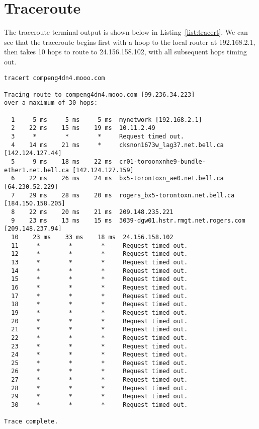 \section*{Traceroute}
The traceroute terminal output is shown below in Listing~\ref{list:tracert}. We can see that the traceroute begins first with a hoop to the local router at 192.168.2.1, then takes 10 hops to route to 24.156.158.102, with all subsequent hops timing out.

\begin{lstlisting}[caption=Traceroute Terminal Output,label=list:tracert]
tracert compeng4dn4.mooo.com

Tracing route to compeng4dn4.mooo.com [99.236.34.223]
over a maximum of 30 hops:

  1     5 ms     5 ms     5 ms  mynetwork [192.168.2.1]
  2    22 ms    15 ms    19 ms  10.11.2.49
  3     *        *        *     Request timed out.
  4    14 ms    21 ms     *     cksnon1673w_lag37.net.bell.ca [142.124.127.44]
  5     9 ms    18 ms    22 ms  cr01-toroonxnhe9-bundle-ether1.net.bell.ca [142.124.127.159]
  6    22 ms    26 ms    24 ms  bx5-torontoxn_ae0.net.bell.ca [64.230.52.229]
  7    29 ms    28 ms    20 ms  rogers_bx5-torontoxn.net.bell.ca [184.150.158.205]
  8    22 ms    20 ms    21 ms  209.148.235.221
  9    23 ms    13 ms    15 ms  3039-dgw01.hstr.rmgt.net.rogers.com [209.148.237.94]
  10    23 ms    33 ms    18 ms  24.156.158.102
  11     *        *        *     Request timed out.
  12     *        *        *     Request timed out.
  13     *        *        *     Request timed out.
  14     *        *        *     Request timed out.
  15     *        *        *     Request timed out.
  16     *        *        *     Request timed out.
  17     *        *        *     Request timed out.
  18     *        *        *     Request timed out.
  19     *        *        *     Request timed out.
  20     *        *        *     Request timed out.
  21     *        *        *     Request timed out.
  22     *        *        *     Request timed out.
  23     *        *        *     Request timed out.
  24     *        *        *     Request timed out.
  25     *        *        *     Request timed out.
  26     *        *        *     Request timed out.
  27     *        *        *     Request timed out.
  28     *        *        *     Request timed out.
  29     *        *        *     Request timed out.
  30     *        *        *     Request timed out.

Trace complete.
\end{lstlisting}

